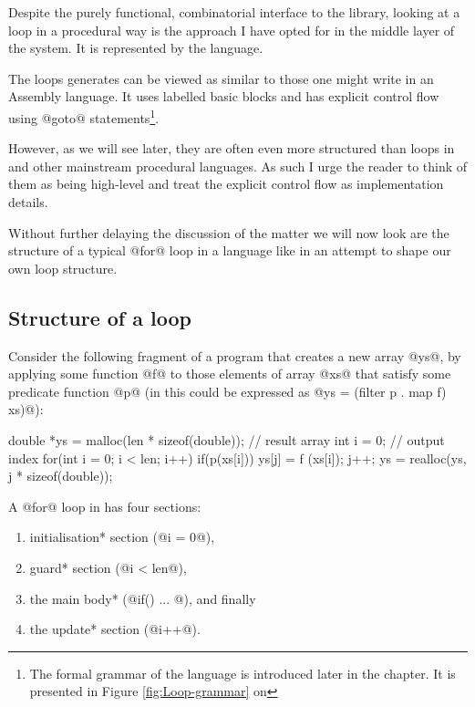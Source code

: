 \documentclass[preamble.tex]{subfiles}
\begin{document}
Despite the purely functional, combinatorial interface to the library, looking at a loop in a procedural way is the approach I have opted for in the middle layer of the system. It is represented by the \Loop language\iloop{}.

The loops \LiveFusion generates can be viewed as similar to those one might write in an Assembly language. It uses labelled basic blocks and has explicit control flow using @goto@ statements\footnote{The formal grammar of the \Loop language is introduced later in the chapter. It is presented in Figure \ref{fig:Loop-grammar} on \pageref{fig:Loop-grammar}}.

However, as we will see later, they are often even more structured than loops in \C and other mainstream procedural languages. As such I urge the reader to think of them as being high-level and treat the explicit control flow as implementation details.


Without further delaying the discussion of the matter we will now look are the structure of a typical @for@ loop in a language like \C in an attempt to shape our own loop structure.


\subsection{Structure of a  loop}

Consider the following fragment of a \C program that creates a new array @ys@, by applying some function @f@ to those elements of array @xs@ that satisfy some predicate function @p@ (in \Haskell this could be expressed as @ys = (filter p . map f) xs)@):

\begin{ccode}[numbers=left]
double *ys = malloc(len * sizeof(double)); // result array
int i = 0;                                 // output index
for(int i = 0; i < len; i++) {
    if(p(xs[i])) {
        ys[j] = f (xs[i]);
        j++;
    }
}
ys = realloc(ys, j * sizeof(double));
\end{ccode}

A @for@ loop in \C has four sections:

\begin{enumerate}
\halfspacing
\item \*initialisation* section (@i = 0@),
\item \*guard* section (@i < len@),
\item the main \*body* (@if(){ ... }@), and finally
\item the \*update* section (@i++@).
\end{enumerate}
\end{document}
